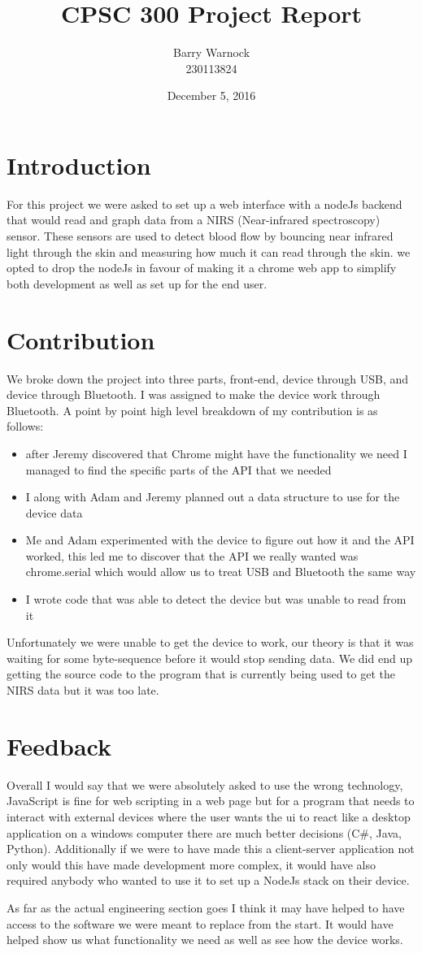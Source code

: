 \documentclass{article}
\begin{document}
\title{CPSC 300 Project Report}
\author{Barry Warnock\\
  230113824}
\date{December 5, 2016}
\maketitle


\section*{Introduction}
For this project we were asked to set up a web interface with a nodeJs backend that would read and graph data from
a NIRS (Near-infrared spectroscopy) sensor. These sensors are used to detect blood flow by bouncing near infrared light
through the skin and measuring how much it can read through the skin. we opted to drop the nodeJs in favour of making
it a chrome web app to simplify both development as well as set up for the end user.

\section*{Contribution}
We broke down the project into three parts, front-end, device through USB, and device through Bluetooth. I was assigned to make the device
work through Bluetooth. A point by point high level breakdown of my contribution is as follows:
\begin{itemize}
\item after Jeremy discovered that Chrome might have the functionality we need I managed to find the specific parts of the API
  that we needed
\item I along with Adam and Jeremy planned out a data structure to use for the device data
\item Me and Adam experimented with the device to figure out how it and the API worked, this led me to discover that
  the API we really wanted was chrome.serial which would allow us to treat USB and Bluetooth the same way
\item I wrote code that was able to detect the device but was unable to read from it
\end{itemize}
Unfortunately we were unable to get the device to work, our theory is that it was waiting for some byte-sequence
before it would stop sending data. We did end up getting the source code to the program that is currently being used to get the
NIRS data but it was too late.

\section*{Feedback}
Overall I would say that we were absolutely asked to use the wrong technology, JavaScript is fine for web scripting in a web page but for
a program that needs to interact with external devices where the user wants the ui to react like a desktop application on a windows computer there
are much better decisions (C\#, Java, Python). Additionally if we were to have made this a client-server application not only would this
have made development more complex, it would have also required anybody who wanted to use it to set up a NodeJs stack on their device.

As far as the actual engineering section goes I think it may have helped to have access to the software we were meant to replace from the start.
It would have helped show us what functionality we need as well as see how the device works. 
\end{document}

